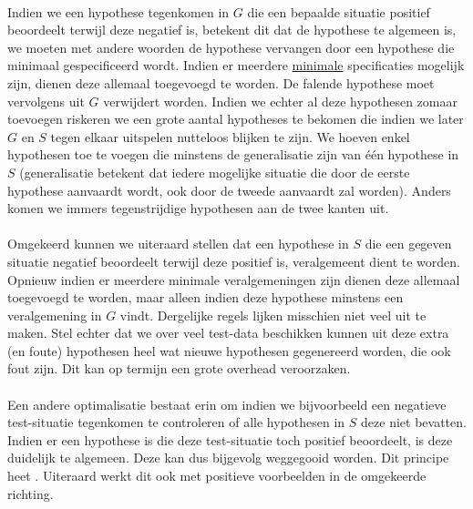 \paragraph{}
Indien we een hypothese tegenkomen in $G$ die een bepaalde situatie positief beoordeelt terwijl deze negatief is, betekent dit dat de hypothese te algemeen is, we moeten met andere woorden de hypothese vervangen door een hypothese die minimaal gespecificeerd wordt. Indien er meerdere \underline{minimale} specificaties mogelijk zijn, dienen deze allemaal toegevoegd te worden. De falende hypothese moet vervolgens uit $G$ verwijdert worden. Indien we echter al deze hypothesen zomaar toevoegen riskeren we een grote aantal hypotheses te bekomen die indien we later $G$ en $S$ tegen elkaar uitspelen nutteloos blijken te zijn. We hoeven enkel hypothesen toe te voegen die minstens de generalisatie zijn van één hypothese in $S$ (generalisatie betekent dat iedere mogelijke situatie die door de eerste hypothese aanvaardt wordt, ook door de tweede aanvaardt zal worden). Anders komen we immers tegenstrijdige hypothesen aan de twee kanten uit.
\paragraph{}
Omgekeerd kunnen we uiteraard stellen dat een hypothese in $S$ die een gegeven situatie negatief beoordeelt terwijl deze positief is, veralgemeent dient te worden. Opnieuw indien er meerdere minimale veralgemeningen zijn dienen deze allemaal toegevoegd te worden, maar alleen indien deze hypothese minstens een veralgemening in $G$ vindt. Dergelijke regels lijken misschien niet veel uit te maken. Stel echter dat we over veel test-data beschikken kunnen uit deze extra (en foute) hypothesen heel wat nieuwe hypothesen gegenereerd worden, die ook fout zijn. Dit kan op termijn een grote overhead veroorzaken.
\paragraph{}
Een andere optimalisatie bestaat erin om indien we bijvoorbeeld een negatieve test-situatie tegenkomen te controleren of alle hypothesen in $S$ deze niet bevatten. Indien er een hypothese is die deze test-situatie toch positief beoordeelt, is deze duidelijk te algemeen. Deze kan dus bijgevolg weggegooid worden. Dit principe heet . Uiteraard werkt dit ook met positieve voorbeelden in de omgekeerde richting.
